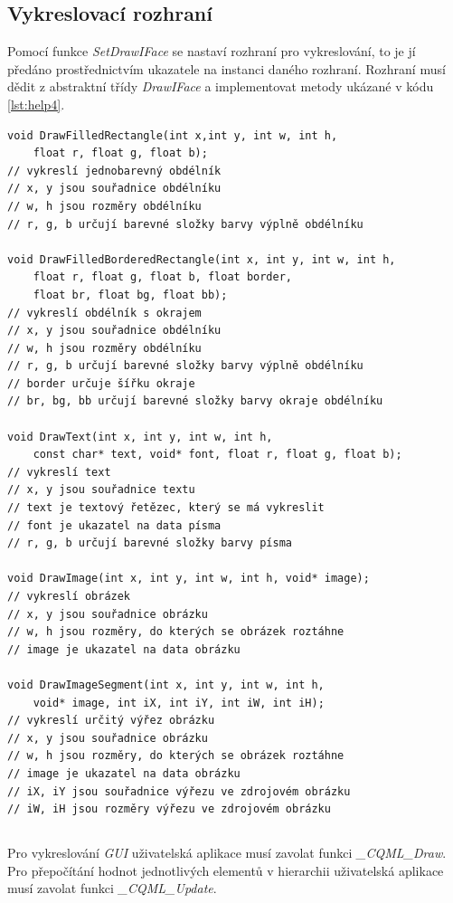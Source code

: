 \documentclass[11pt,twoside,a4paper]{book}
\begin{document}
\subsection{\label{SEC:drawI}Vykreslovací rozhraní}
Pomocí funkce \textit{SetDrawIFace} se nastaví rozhraní pro vykreslování, to je jí předáno prostřednictvím ukazatele na instanci daného rozhraní. Rozhraní musí dědit z abstraktní třídy \textit{DrawIFace} a implementovat metody ukázané v kódu \ref{lst:help4}.
\begin{lstlisting}[float,frame=single,caption=Metody vykreslovacího rozhraní.,label=lst:help4]
void DrawFilledRectangle(int x,int y, int w, int h,
	float r, float g, float b);
// vykreslí jednobarevný obdélník
// x, y jsou souřadnice obdélníku
// w, h jsou rozměry obdélníku
// r, g, b určují barevné složky barvy výplně obdélníku

void DrawFilledBorderedRectangle(int x, int y, int w, int h, 
	float r, float g, float b, float border, 
	float br, float bg, float bb);
// vykreslí obdélník s okrajem
// x, y jsou souřadnice obdélníku
// w, h jsou rozměry obdélníku
// r, g, b určují barevné složky barvy výplně obdélníku
// border určuje šířku okraje
// br, bg, bb určují barevné složky barvy okraje obdélníku

void DrawText(int x, int y, int w, int h, 
	const char* text, void* font, float r, float g, float b);
// vykreslí text
// x, y jsou souřadnice textu
// text je textový řetězec, který se má vykreslit
// font je ukazatel na data písma
// r, g, b určují barevné složky barvy písma

void DrawImage(int x, int y, int w, int h, void* image);
// vykreslí obrázek
// x, y jsou souřadnice obrázku
// w, h jsou rozměry, do kterých se obrázek roztáhne
// image je ukazatel na data obrázku

void DrawImageSegment(int x, int y, int w, int h,
	void* image, int iX, int iY, int iW, int iH);
// vykreslí určitý výřez obrázku
// x, y jsou souřadnice obrázku
// w, h jsou rozměry, do kterých se obrázek roztáhne
// image je ukazatel na data obrázku
// iX, iY jsou souřadnice výřezu ve zdrojovém obrázku
// iW, iH jsou rozměry výřezu ve zdrojovém obrázku
\end{lstlisting}

\subsection{\label{SEC:updateDraw}}
Pro vykreslování \textit{GUI} uživatelská aplikace musí zavolat funkci \textit{\_CQML\_Draw}. Pro přepočítání hodnot jednotlivých elementů v hierarchii uživatelská aplikace musí zavolat funkci \textit{\_CQML\_Update}.
\end{document}

